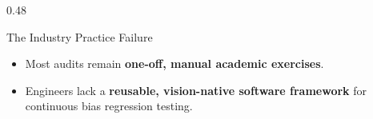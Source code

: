 \begin{frame}
\begin{columns}[T]
\begin{column}{0.48\textwidth}
      \vspace{0.1cm}
      \begin{card}{The Industry Practice Failure}
        \scriptsize
        \begin{itemize}\scriptsize
          \item Most audits remain \textbf{one-off, manual academic exercises}.
          \item Engineers lack a \textbf{reusable, vision-native software framework} for continuous bias regression testing.
        \end{itemize}
      \end{card}
    \end{column}
  \end{columns}
\end{frame}
